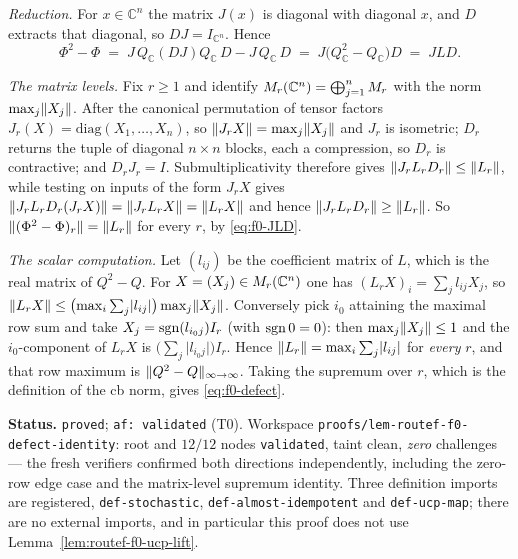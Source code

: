 \emph{Reduction.} For $x\in\mathbb C^{n}$ the matrix $J(x)$ is diagonal with diagonal $x$,
and $D$ extracts that diagonal, so $DJ=I_{\mathbb C^{n}}$. Hence
\begin{equation}\label{eq:f0-JLD}
  \Phi^{2}-\Phi\;=\;J\,Q_{\mathbb C}(DJ)Q_{\mathbb C}\,D-J\,Q_{\mathbb C}\,D
  \;=\;J\bigl(Q_{\mathbb C}^{2}-Q_{\mathbb C}\bigr)D\;=\;JLD .
\end{equation}

\emph{The matrix levels.} Fix $r\ge1$ and identify
$M_{r}(\mathbb C^{n})=\bigoplus_{j=1}^{n}M_{r}$ with the norm $\max_{j}\lVert X_{j}\rVert$.
After the canonical permutation of tensor factors $J_{r}(X)=\mathrm{diag}(X_{1},\dots,X_{n})$,
so $\lVert J_{r}X\rVert=\max_{j}\lVert X_{j}\rVert$ and $J_{r}$ is isometric; $D_{r}$ returns the tuple
of diagonal $n\times n$ blocks, each a compression, so $D_{r}$ is contractive; and
$D_{r}J_{r}=I$. Submultiplicativity therefore gives
$\lVert J_{r}L_{r}D_{r}\rVert\le\lVert L_{r}\rVert$, while testing on inputs of the form $J_{r}X$ gives
$\lVert J_{r}L_{r}D_{r}(J_{r}X)\rVert=\lVert J_{r}L_{r}X\rVert=\lVert L_{r}X\rVert$ and hence
$\lVert J_{r}L_{r}D_{r}\rVert\ge\lVert L_{r}\rVert$. So $\lVert (\Phi^{2}-\Phi)_{r}\rVert=\lVert L_{r}\rVert$ for
every $r$, by \eqref{eq:f0-JLD}.

\emph{The scalar computation.} Let $(l_{ij})$ be the coefficient matrix of $L$, which is
the real matrix of $Q^{2}-Q$. For $X=(X_{j})\in M_{r}(\mathbb C^{n})$ one has
$(L_{r}X)_{i}=\sum_{j}l_{ij}X_{j}$, so
$\lVert L_{r}X\rVert\le\bigl(\max_{i}\sum_{j}\lvert l_{ij}\rvert\bigr)\max_{j}\lVert X_{j}\rVert$.
Conversely pick $i_{0}$ attaining the maximal row sum and take
$X_{j}=\operatorname{sgn}(l_{i_{0}j})I_{r}$ (with $\operatorname{sgn} 0=0$): then $\max_{j}\lVert X_{j}\rVert\le1$ and the
$i_{0}$-component of $L_{r}X$ is $\bigl(\sum_{j}\lvert l_{i_{0}j}\rvert\bigr)I_{r}$. Hence
$\lVert L_{r}\rVert=\max_{i}\sum_{j}\lvert l_{ij}\rvert$ for \emph{every} $r$, and that row
maximum is $\lVert Q^{2}-Q \rVert_{\infty\to\infty}$. Taking the supremum over $r$, which is the definition of the
cb norm, gives \eqref{eq:f0-defect}.

\medskip
\noindent\textbf{Status.} \texttt{proved}; \texttt{af: validated} (T0). Workspace
\texttt{proofs/lem-routef-f0-defect-identity}: root and $12/12$ nodes \texttt{validated},
taint clean, \emph{zero} challenges --- the fresh verifiers confirmed both directions
independently, including the zero-row edge case and the matrix-level supremum identity.
Three definition imports are registered, \texttt{def-stochastic},
\texttt{def-almost-idempotent} and \texttt{def-ucp-map}; there are no external imports, and
in particular this proof does not use Lemma~\ref{lem:routef-f0-ucp-lift}.


